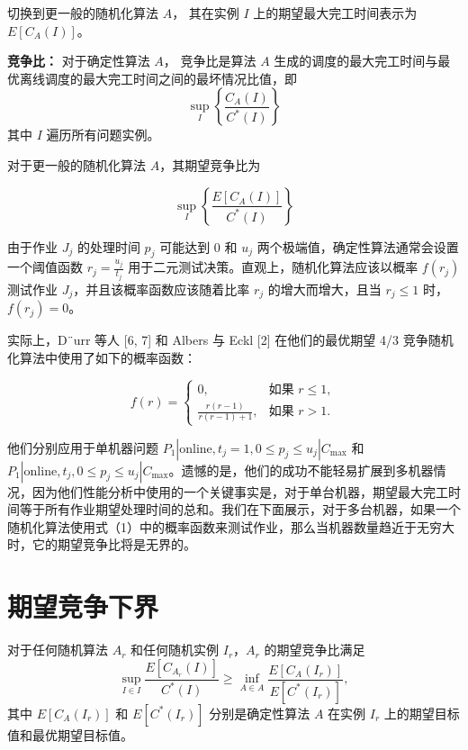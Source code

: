 切换到更一般的随机化算法 \( A \)，
其在实例 \( I \) 上的期望最大完工时间表示为 \( E[C_A(I)] \)。

\begin{defi}
    \textbf{竞争比：}
    对于确定性算法 \( A \)，
    竞争比是算法 \( A \) 生成的调度的最大完工时间与最优离线调度的最大完工时间之间的最坏情况比值，即
    \[
    \sup_I \left\{ \frac{C_A(I)}{C^*(I)} \right\}
    \]
    其中 \( I \) 遍历所有问题实例。
\end{defi}

对于更一般的随机化算法 \( A \)，其期望竞争比为

\[
\sup_I \left\{ \frac{E[C_A(I)]}{C^*(I)} \right\}
\]

由于作业 \( J_j \) 的处理时间 \( p_j \) 可能达到 0 和 \( u_j \) 两个极端值，确定性算法通常会设置一个阈值函数 \( r_j = \frac{u_j}{t_j} \) 用于二元测试决策。直观上，随机化算法应该以概率 \( f(r_j) \) 测试作业 \( J_j \)，并且该概率函数应该随着比率 \( r_j \) 的增大而增大，且当 \( r_j \leq 1 \) 时，\( f(r_j) = 0 \)。

实际上，D¨urr 等人 [6, 7] 和 Albers 与 Eckl [2] 在他们的最优期望 4/3 竞争随机化算法中使用了如下的概率函数：

\[
f(r) = 
\begin{cases}
0, & \text{如果 } r \leq 1, \\
\frac{r(r-1)}{r(r-1)+1}, & \text{如果 } r > 1.
\end{cases}
\]

他们分别应用于单机器问题 \( P_1 | \text{online}, t_j = 1, 0 \leq p_j \leq u_j | C_{\text{max}} \) 和 \( P_1 | \text{online}, t_j, 0 \leq p_j \leq u_j | C_{\text{max}} \)。遗憾的是，他们的成功不能轻易扩展到多机器情况，因为他们性能分析中使用的一个关键事实是，对于单台机器，期望最大完工时间等于所有作业期望处理时间的总和。我们在下面展示，对于多台机器，如果一个随机化算法使用式（1）中的概率函数来测试作业，那么当机器数量趋近于无穷大时，它的期望竞争比将是无界的。

\section{期望竞争下界}

\begin{thm}
    对于任何随机算法 \( A_r \) 和任何随机实例 \( I_r \)，\( A_r \) 的期望竞争比满足
    \[
    \sup_{I \in I} \frac{E[C_{A_r}(I)]}{C^*(I)} \geq \inf_{A \in A} \frac{E[C_A(I_r)]}{E[C^*(I_r)]},
    \]
    其中 \( E[C_A(I_r)] \) 和 \( E[C^*(I_r)] \) 分别是确定性算法 \( A \) 在实例 \( I_r \) 上的期望目标值和最优期望目标值。
\end{thm}

